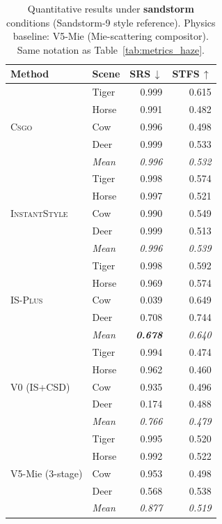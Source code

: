 \begin{table}[htbp]
  \centering\small
  \caption{Quantitative results under \textbf{sandstorm} conditions (Sandstorm-9 style reference). Physics baseline: V5-Mie (Mie-scattering compositor). Same notation as Table~\ref{tab:metrics_haze}.}
  \label{tab:metrics_sandstorm}
  \setlength{\tabcolsep}{4pt}
  \begin{tabular}{@{}llrr@{}}
    \toprule
    \textbf{Method} & \textbf{Scene} & \textbf{SRS\,$\downarrow$} & \textbf{STFS\,$\uparrow$} \\
    \midrule
    \multirow{5}{*}{\textsc{Csgo}} & Tiger & 0.999 & 0.615 \\
    & Horse & 0.991 & 0.482 \\
    & Cow & 0.996 & 0.498 \\
    & Deer & 0.999 & 0.533 \\
    & \textit{Mean} & \textit{0.996} & \textit{0.532} \\
    \midrule
    \multirow{5}{*}{\textsc{InstantStyle}} & Tiger & 0.998 & 0.574 \\
    & Horse & 0.997 & 0.521 \\
    & Cow & 0.990 & 0.549 \\
    & Deer & 0.999 & 0.513 \\
    & \textit{Mean} & \textit{0.996} & \textit{0.539} \\
    \midrule
    \multirow{5}{*}{\textsc{IS-Plus}} & Tiger & 0.998 & 0.592 \\
    & Horse & 0.969 & 0.574 \\
    & Cow & 0.039 & 0.649 \\
    & Deer & 0.708 & 0.744 \\
    & \textit{Mean} & \textit{\textbf{0.678}} & \textit{0.640} \\
    \midrule
    \multirow{5}{*}{V0 (IS+CSD)} & Tiger & 0.994 & 0.474 \\
    & Horse & 0.962 & 0.460 \\
    & Cow & 0.935 & 0.496 \\
    & Deer & 0.174 & 0.488 \\
    & \textit{Mean} & \textit{0.766} & \textit{0.479} \\
    \midrule
    \multirow{5}{*}{V5-Mie (3-stage)} & Tiger & 0.995 & 0.520 \\
    & Horse & 0.992 & 0.522 \\
    & Cow & 0.953 & 0.498 \\
    & Deer & 0.568 & 0.538 \\
    & \textit{Mean} & \textit{0.877} & \textit{0.519} \\

\end{tabular}
\end{table}
